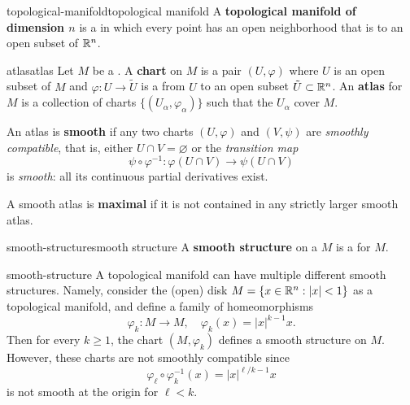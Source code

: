 \begin{topic}{topological-manifold}{topological manifold}
    A \textbf{topological manifold of dimension $n$} is a    in which every point has an open neighborhood that is  to an open subset of $\mathbb{R}^n$.
\end{topic}

\begin{topic}{atlas}{atlas}
    Let $M$ be a . A \textbf{chart} on $M$ is a pair $(U, \varphi)$ where $U$ is an open subset of $M$ and $\varphi : U \to \tilde{U}$ is a  from $U$ to an open subset $\tilde{U} \subset \mathbb{R}^n$. An \textbf{atlas} for $M$ is a collection of charts $\{ (U_\alpha, \varphi_\alpha) \}$ such that the $U_\alpha$ cover $M$.
    
    An atlas is \textbf{smooth} if any two charts $(U, \varphi)$ and $(V, \psi)$ are \textit{smoothly compatible}, that is, either $U \cap V = \varnothing$ or the \textit{transition map}
    \[ \psi \circ \varphi^{-1} : \varphi(U \cap V) \to \psi(U \cap V) \]
    is \textit{smooth}: all its continuous partial derivatives exist.
    
    A smooth atlas is \textbf{maximal} if it is not contained in any strictly larger smooth atlas.
\end{topic}

\begin{topic}{smooth-structure}{smooth structure}
    A \textbf{smooth structure} on a  $M$ is a  for $M$.
\end{topic}

\begin{example}{smooth-structure}
    A topological manifold can have multiple different smooth structures. Namely, consider the (open) disk $M = \{ x \in \mathbb{R}^n : |x| < 1 \}$ as a topological manifold, and define a family of homeomorphisms
    \[ \varphi_k : M \to M, \quad \varphi_k(x) = |x|^{k - 1} x . \]
    Then for every $k \ge 1$, the chart $(M, \varphi_k)$ defines a smooth structure on $M$. However, these charts are not smoothly compatible since
    \[ \varphi_\ell \circ \varphi_k^{-1} (x) = |x|^{\ell/k - 1} x \]
    is not smooth at the origin for $\ell < k$.
\end{example}

